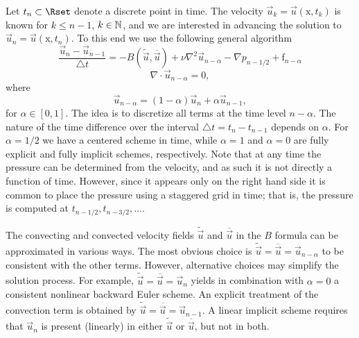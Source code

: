 Let $t_n \subset \Rset$ denote a discrete point in time. The velocity
$\vec{u}_k=\vec{u}(\text{x},t_k)$ is known for $k\leqslant n-1$, $k \in
\mathbb{N}$, and we are interested in advancing the solution to
$\vec{u}_{n}=\vec{u}(\text{x},t_{n})$. To this end we use the
following general algorithm
\begin{equation}
\label{eq:mortensen:NS_d} \frac{\vec{u}_{n}-\vec{u}_{n-1}}{\triangle t} = - B(\tilde{\vec{u}},\overline{\vec{u}}) + \nu \nabla^2 \vec{u}_{n-\alpha} -\nabla p_{n-1/2} + \text{f}_{n-\alpha}
\end{equation}
\begin{equation}
 \label{eq:mortensen:cont_d} \nabla \cdot \vec{u}_{n-\alpha} =0,
\end{equation}
where
\[ \vec{u}_{n-\alpha}=(1-\alpha) \vec{u}_{n} + \alpha \vec{u}_{n-1},\]
for $\alpha \in [0,1]$.  The idea is to discretize all terms at the
time level $n-\alpha$. The nature of the time difference over the
interval $\triangle t = t_{n}-t_{n-1}$ depends on $\alpha$. For
$\alpha =1/2$ we have a centered scheme in time, while $\alpha =1$ and
$\alpha=0$ are fully explicit and fully implicit schemes,
respectively. Note that at any time the pressure can be determined
from the velocity, and as such it is not directly a function of
time. However, since it appears only on the right hand side it is
common to place the pressure using a staggered grid in time; that is,
the pressure is computed at $t_{n-1/2}, t_{n-3/2}, \ldots$.

The convecting and convected velocity fields $\tilde{\vec{u}}$ and
$\overline{\vec{u}}$ in the $B$ formula can be approximated in various
ways. The most obvious choice is
$\tilde{\vec{u}}=\overline{\vec{u}}=\vec{u}_{n-\alpha}$ to be
consistent with the other terms. However, alternative choices may
simplify the solution process. For example,
$\tilde{\vec{u}}=\overline{\vec{u}}=\vec{u}_{n}$ yields in combination
with $\alpha=0$ a consistent nonlinear backward Euler scheme. An
explicit treatment of the convection term is obtained by
$\tilde{\vec{u}} = \overline{\vec{u}} = \vec{u}_{n-1}$.  A linear
implicit scheme requires that $\vec{u}_{n}$ is present (linearly) in
either $\tilde{\vec{u}}$ or $\overline{\vec{u}}$, but not in both.

